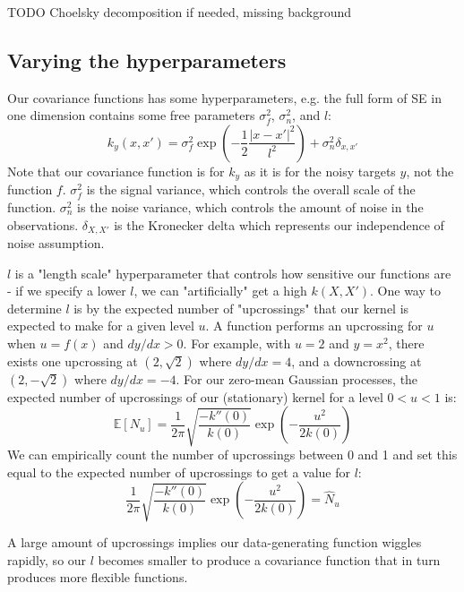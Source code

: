 TODO Choelsky decomposition if needed, missing background


\subsection{Varying the hyperparameters \cite{gp-ml}}
Our covariance functions has some hyperparameters, e.g. the full form of SE in one dimension contains some free parameters $\sigma^2_f$, $\sigma^2_n$, and $l$:
\begin{equation*}
    k_y(x,x') = \sigma^2_f \exp\left(-\frac{1}{2}\frac{|x - x'|^2}{l^2}\right) + \sigma^2_n\delta_{x,x'}
\end{equation*}
Note that our covariance function is for $k_y$ as it is for the noisy targets $y$, not the function $f$. $\sigma^2_f$ is the signal variance, which controls the overall scale of the function. $\sigma^2_n$ is the noise variance, which controls the amount of noise in the observations. $\delta_{X,X'}$ is the Kronecker delta which represents our independence of noise assumption.

$l$ is a "length scale" hyperparameter that controls how sensitive our functions are - if we specify a lower $l$, we can "artificially" get a high $k(X,X')$. One way to determine $l$ is by the expected number of "upcrossings" that our kernel is expected to make for a given level $u$. A function performs an upcrossing for $u$ when $u = f(x)$ and $dy/dx > 0$. For example, with $u = 2$ and $y = x^2$, there exists one upcrossing at $(2, \sqrt{2})$ where $dy/dx = 4$, and a downcrossing at $(2, -\sqrt{2})$ where $dy/dx = -4$. For our zero-mean Gaussian processes, the expected number of upcrossings of our (stationary) kernel for a level $ 0 < u < 1$ is:
\begin{equation*}
    \mathbb{E}[N_u] = \frac{1}{2\pi} \sqrt{\frac{-k''(0)}{k(0)}} \exp \left(-\frac{u^2}{2k(0)}\right)
\end{equation*}
We can empirically count the number of upcrossings between 0 and 1 and set this equal to the expected number of upcrossings to get a value for $l$:
\begin{equation} \label{eq:general_l}
        \frac{1}{2\pi} \sqrt{\frac{-k''(0)}{k(0)}} \exp \left(-\frac{u^2}{2k(0)}\right) = \hat{N}_u
\end{equation}

A large amount of upcrossings implies our data-generating function wiggles rapidly, so our $l$ becomes smaller to produce a covariance function that in turn produces more flexible functions.

